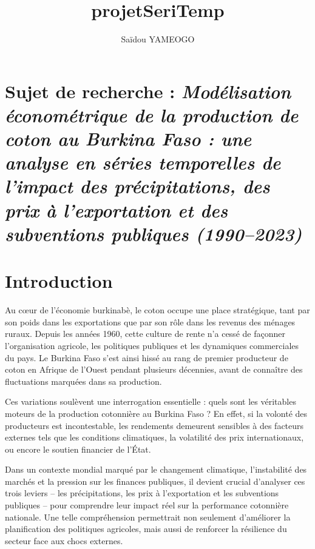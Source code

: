 \documentclass[
  letterpaper,
  DIV=11,
  numbers=noendperiod]{scrartcl}
\title{projetSeriTemp}
\author{Saïdou YAMEOGO}
\date{}
\begin{document}
\maketitle


\section{\texorpdfstring{Sujet de recherche : \textbf{\emph{Modélisation
économétrique de la production de coton au Burkina Faso : une analyse en
séries temporelles de l'impact des précipitations, des prix à
l'exportation et des subventions publiques
(1990--2023)}}}{Sujet de recherche : Modélisation économétrique de la production de coton au Burkina Faso : une analyse en séries temporelles de l'impact des précipitations, des prix à l'exportation et des subventions publiques (1990--2023)}}\label{sujet-de-recherche-moduxe9lisation-uxe9conomuxe9trique-de-la-production-de-coton-au-burkina-faso-une-analyse-en-suxe9ries-temporelles-de-limpact-des-pruxe9cipitations-des-prix-uxe0-lexportation-et-des-subventions-publiques-19902023}

\section{Introduction}\label{introduction}

Au cœur de l'économie burkinabè, le coton occupe une place stratégique,
tant par son poids dans les exportations que par son rôle dans les
revenus des ménages ruraux. Depuis les années 1960, cette culture de
rente n'a cessé de façonner l'organisation agricole, les politiques
publiques et les dynamiques commerciales du pays. Le Burkina Faso s'est
ainsi hissé au rang de premier producteur de coton en Afrique de l'Ouest
pendant plusieurs décennies, avant de connaître des fluctuations
marquées dans sa production.

Ces variations soulèvent une interrogation essentielle : quels sont les
véritables moteurs de la production cotonnière au Burkina Faso ? En
effet, si la volonté des producteurs est incontestable, les rendements
demeurent sensibles à des facteurs externes tels que les conditions
climatiques, la volatilité des prix internationaux, ou encore le soutien
financier de l'État.

Dans un contexte mondial marqué par le changement climatique,
l'instabilité des marchés et la pression sur les finances publiques, il
devient crucial d'analyser ces trois leviers -- les précipitations, les
prix à l'exportation et les subventions publiques -- pour comprendre
leur impact réel sur la performance cotonnière nationale. Une telle
compréhension permettrait non seulement d'améliorer la planification des
politiques agricoles, mais aussi de renforcer la résilience du secteur
face aux chocs externes.
\end{document}
